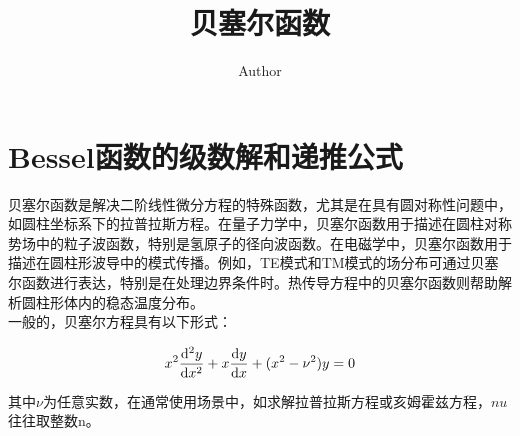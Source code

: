 \documentclass[9pt,a4paper,twoside]{tau-class/tau}
\title{贝塞尔函数}
\author[a,1]{Author}
\affil[a]{武汉大学，物理科学与技术学院}
\begin{document}
		
    \maketitle 
    \thispagestyle{firststyle}
    \tableofcontents
    \linenumbers 
    

\section{Bessel函数的级数解和递推公式}

贝塞尔函数是解决二阶线性微分方程的特殊函数，尤其是在具有圆对称性问题中，如圆柱坐标系下的拉普拉斯方程。在量子力学中，贝塞尔函数用于描述在圆柱对称势场中的粒子波函数，特别是氢原子的径向波函数。在电磁学中，贝塞尔函数用于描述在圆柱形波导中的模式传播。例如，TE模式和TM模式的场分布可通过贝塞尔函数进行表达，特别是在处理边界条件时。热传导方程中的贝塞尔函数则帮助解析圆柱形体内的稳态温度分布。\\

一般的，贝塞尔方程具有以下形式：
\begin{tauenv}[frametitle=Bessel equation:]
	\begin{align}
		x^2\dv[2]{y}{x}+x\dv{y}{x}+(x^2-\nu ^2)y=0
	\end{align}
\end{tauenv}
其中$\nu$为任意实数，在通常使用场景中，如求解拉普拉斯方程或亥姆霍兹方程，$nu$往往取整数n。
\end{document}
